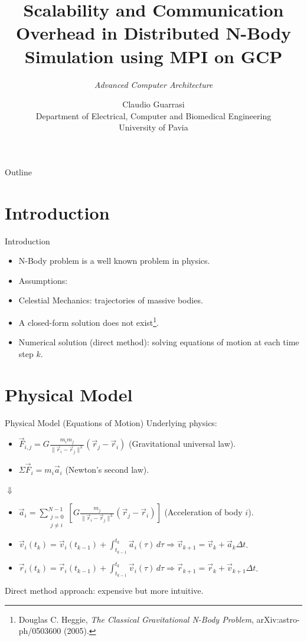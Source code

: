 \documentclass{beamer}
\title{Scalability and Communication Overhead in Distributed N-Body Simulation using MPI on GCP}
\subtitle{\textit{Advanced Computer Architecture}}
\author{Claudio Guarrasi \\ \small{Department of Electrical, Computer and Biomedical Engineering} \\ \small{University of Pavia}}
\institute{}
\date{}
\begin{document}
\maketitle

\begin{frame}{Outline}
  \tableofcontents
\end{frame}

\section{Introduction}
\begin{frame}{Introduction}
\begin{itemize}
	\item N-Body problem is a well known problem in physics.
	\item Assumptions:
	\item Celestial Mechanics: trajectories of massive bodies.
	\item A closed-form solution does not exist\footnote{Douglas C. Heggie, \emph{The Classical Gravitational N-Body Problem}, arXiv:astro-ph/0503600 (2005).}.
	\item Numerical solution (direct method): solving equations of motion at each time step $k$.	
\end{itemize}
\end{frame}

\section{Physical Model}
\begin{frame}{Physical Model (Equations of Motion)}
Underlying physics:
\begin{itemize}
	\item $\vec{F}_{i,j}=G\frac{m_{i} m_{j}}{\|\vec{r}_{i}-\vec{r}_{j}\|^3}(\vec{r}_{j}-\vec{r}_{i})$ (Gravitational universal law).
	\item $\Sigma\vec{F}_i = m_i\vec{a}_i$ (Newton's second law).
\end{itemize}
\begin{center}
	$\Downarrow$
\end{center}
\begin{itemize}
	\item $\vec{a}_i=\sum_{\substack{j=0 \\ j \neq i}}^{N-1}\left[G\frac{m_j}{\|\vec{r}_i-\vec{r}_j\|^3}(\vec{r}_j-\vec{r}_i)\right]$ (Acceleration of body $i$).
	\item $\vec{v}_i(t_k) = \vec{v}_i(t_{k-1}) + \int_{t_{k-1}}^{t_k} \vec{a}_i(\tau)\, d\tau \Rightarrow \vec{v}_{k+1}=\vec{v}_k+\vec{a}_k\Delta t$.
	\item $\vec{r}_i(t_k) = \vec{r}_i(t_{k-1}) + \int_{t_{k-1}}^{t_k} \vec{v}_i(\tau)\, d\tau \Rightarrow \vec{r}_{k+1}=\vec{r}_k+\vec{v}_{k+1}\Delta t$.
\end{itemize}
Direct method approach: expensive but more intuitive.
\end{frame}
\end{document}
